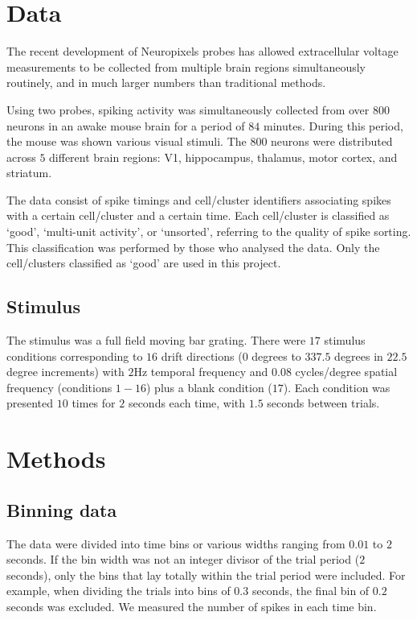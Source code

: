 \documentclass[a4paper,12pt]{article}
\theoremstyle{definition}
\begin{document}
\section{Data}
The recent development of Neuropixels probes has allowed extracellular voltage measurements to be collected from multiple brain regions simultaneously routinely, and in much larger numbers than traditional methods.

Using two probes, spiking activity was simultaneously collected from over $800$ neurons in an awake mouse brain for a period of $84$ minutes. During this period, the mouse was shown various visual stimuli. The $800$ neurons were distributed across $5$ different brain regions: V1, hippocampus, thalamus, motor cortex, and striatum.

The data consist of spike timings and cell/cluster identifiers associating spikes with a certain cell/cluster and a certain time. Each cell/cluster is classified as `good', `multi-unit activity', or `unsorted', referring to the quality of spike sorting. This classification was performed by those who analysed the data. Only the cell/clusters classified as `good' are used in this project.

\subsection{Stimulus}

The stimulus was a full field moving bar grating. There were $17$ stimulus conditions corresponding to $16$ drift directions ($0$ degrees to $337.5$ degrees in $22.5$ degree increments) with $2$Hz temporal frequency and $0.08$ cycles/degree spatial frequency (conditions $1-16$) plus a blank condition ($17$). Each condition was presented $10$ times for $2$ seconds each time, with $1.5$ seconds between trials.

\section{Methods}
\subsection{Binning data}
The data were divided into time bins or various widths ranging from $0.01$ to $2$ seconds. If the bin width was not an integer divisor of the trial period ($2$ seconds), only the bins that lay totally within the trial period were included. For example, when dividing the trials into bins of $0.3$ seconds, the final bin of $0.2$ seconds was excluded. We measured the number of spikes in each time bin.
\end{document}
